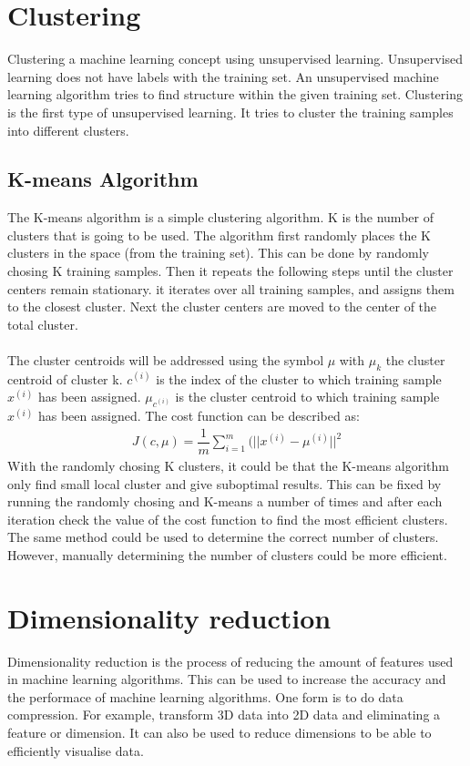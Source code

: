 \section{Clustering}
Clustering a machine learning concept using unsupervised learning. Unsupervised learning does not have labels with the training set. An unsupervised machine learning algorithm tries to find structure within the given training set. Clustering is the first type of unsupervised learning. It tries to cluster the training samples into different clusters.

\subsection{K-means Algorithm}
The K-means algorithm is a simple clustering algorithm. K is the number of clusters that is going to be used. The algorithm first randomly places the K clusters in the space (from the training set). This can be done by randomly chosing K training samples. Then it repeats the following steps until the cluster centers remain stationary. it iterates over all training samples, and assigns them to the closest cluster. Next the cluster centers are moved to the center of the total cluster. \\\\
The cluster centroids will be addressed using the symbol $\mu$ with $\mu_k$ the cluster centroid of cluster k. $c^{(i)}$ is the index of the cluster to which training sample  $x^{(i)}$ has been assigned. $\mu_{c^{(i)}}$ is the cluster centroid to which training sample $x^{(i)}$ has been assigned. The cost function can be described as:
\begin{align}
J(c, \mu) = \dfrac{1}{m} \sum\limits_{i=1}^m(|| x^{(i)} - \mu^{(i)}||^2
\end{align}
With the randomly chosing K clusters, it could be that the K-means algorithm only find small local cluster and give suboptimal results. This can be fixed by running the randomly chosing and K-means a number of times and after each iteration check the value of the cost function to find the most efficient clusters. The same method could be used to determine the correct number of clusters. However, manually determining the number of clusters could be more efficient.

\section{Dimensionality reduction}
Dimensionality reduction is the process of reducing the amount of features used in machine learning algorithms. This can be used to increase the accuracy and the performace of machine learning algorithms. One form is to do data compression. For example, transform 3D data into 2D data and eliminating a feature or dimension. It can also be used to reduce dimensions to be able to efficiently visualise data.

